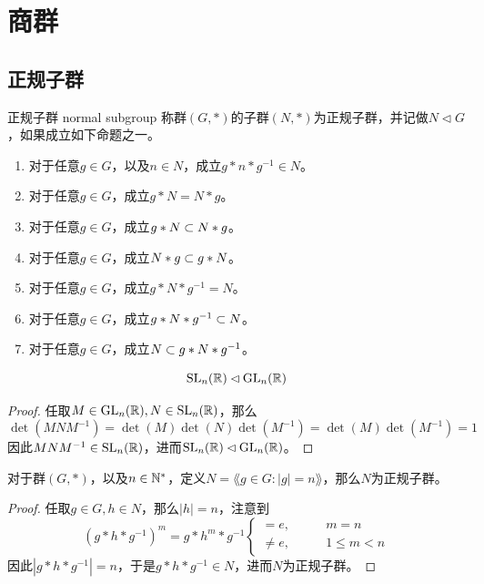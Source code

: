 \section{商群}

\subsection{正规子群}

\begin{definition}{正规子群 normal subgroup}
	称群$(G,*)$的子群$(N,*)$为正规子群，并记做$N \lhd  G$，如果成立如下命题之一。
	\begin{enumerate}
		\item 对于任意$g\in G$，以及$n\in N$，成立$g*n*g^{-1}\in N$。
		\item 对于任意$g\in G$，成立$g*N=N*g$。
		\item 对于任意$g\in G$，成立$g*N\subset N*g$。
		\item 对于任意$g\in G$，成立$N*g\subset g*N$。
		\item 对于任意$g\in G$，成立$g*N*g^{-1}=N$。
		\item 对于任意$g\in G$，成立$g*N*g^{-1}\subset N$。
		\item 对于任意$g\in G$，成立$N\subset g*N*g^{-1}$。
	\end{enumerate}
\end{definition}

\begin{problem}
	$$
	\mathrm{SL}_n(\mathbb{R})\lhd \mathrm{GL}_n(\mathbb{R})
	$$
\end{problem}

\begin{proof}
	任取$M\in \mathrm{GL}_n(\mathbb{R}),N\in \mathrm{SL}_n(\mathbb{R})$，那么
	$$
	\det(MNM^{-1})=\det(M)\det(N)\det(M^{-1})=\det(M)\det(M^{-1})=1
	$$
	因此$MNM^{-1}\in \mathrm{SL}_n(\mathbb{R})$，进而$\mathrm{SL}_n(\mathbb{R})\lhd \mathrm{GL}_n(\mathbb{R})$。
\end{proof}

\begin{problem}
	对于群$(G,*)$，以及$n\in\mathbb{N}^*$，定义$N=\lang g\in G:|g|=n \rang$，那么$N$为正规子群。
\end{problem}

\begin{proof}
	任取$g\in G,h\in N$，那么$|h|=n$，注意到
	$$
	(g*h*g^{-1})^m=g*h^{m}*g^{-1}\begin{cases}
		=e,\qquad & m=n\\
		\ne e,\qquad & 1\le m<n
	\end{cases}
	$$
	因此$|g*h*g^{-1}|=n$，于是$g*h*g^{-1}\in N$，进而$N$为正规子群。
\end{proof}

